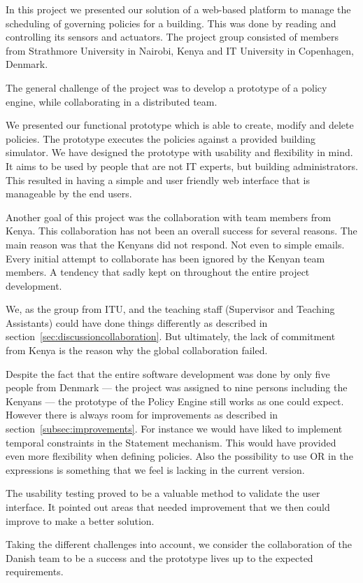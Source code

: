 In this project we presented our solution of a web-based platform to manage the scheduling of governing policies for a building. This was done by reading and controlling its sensors and actuators. The project group consisted of members from Strathmore University in Nairobi, Kenya and IT University in Copenhagen, Denmark.
 
The general challenge of the project was to develop a prototype of a policy engine, while collaborating in a distributed team.
 
We presented our functional prototype which is able to create, modify and delete policies. The prototype executes the policies against a provided building simulator. We have designed the prototype with usability and flexibility in mind. It aims to be used by people that are not IT experts, but building administrators. This resulted in having a simple and user friendly web interface that is manageable by the end users.
 
Another goal of this project was the collaboration with team members from Kenya. This collaboration has not been an overall success for several reasons. The main reason was that the Kenyans did not respond. Not even to simple emails. Every initial attempt to collaborate has been ignored by the Kenyan team members. A tendency that sadly kept on throughout the entire project development.
 
We, as the group from ITU, and the teaching staff (Supervisor and Teaching Assistants) could have done things differently as described in section~\ref{sec:discussioncollaboration}. But ultimately, the lack of commitment from Kenya is the reason why the global collaboration failed.
 
Despite the fact that the entire software development was done by only five people from Denmark --- the project was assigned to nine persons including the Kenyans --- the prototype of the Policy Engine still works as one could expect. However there is always room for improvements as described in section~\ref{subsec:improvements}. For instance we would have liked to implement temporal constraints in the Statement mechanism. This would have provided even more flexibility when defining policies. Also the possibility to use OR in the expressions is something that we feel is lacking in the current version.
 
The usability testing proved to be a valuable method to validate the user interface. It pointed out areas that needed improvement that we then could improve to make a better solution.
 
Taking the different challenges into account, we consider the collaboration of the Danish team to be a success and the prototype lives up to the expected requirements.